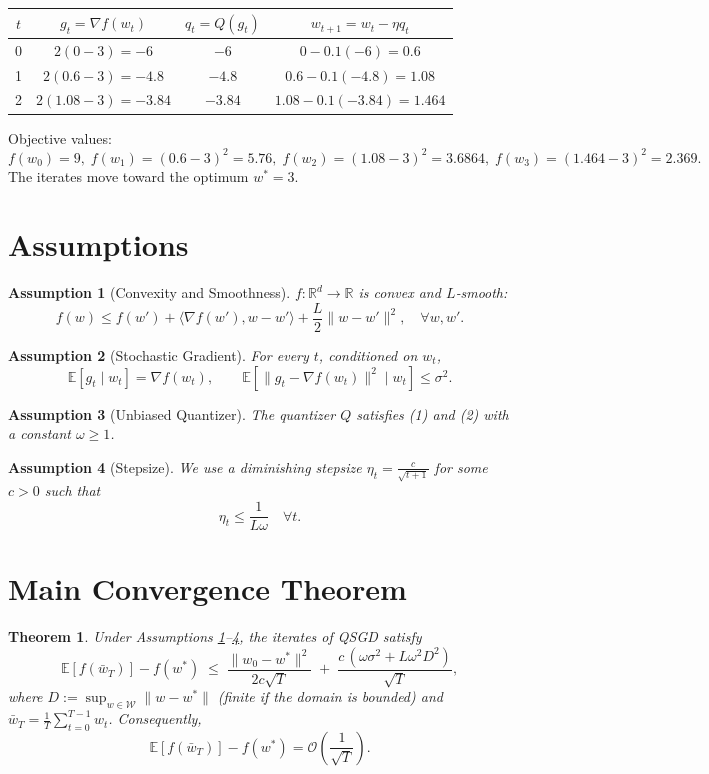 \documentclass[11pt]{article}
\newtheorem{theorem}{Theorem}
\newtheorem{assumption}{Assumption}
\newcommand{\E}{\mathbb{E}}
\newcommand{\R}{\mathbb{R}}
\begin{document}
\begin{center}
\begin{tabular}{c|c|c|c}
$t$ & $g_{t}= \nabla f(w_{t})$ & $q_{t}=Q(g_{t})$ & $w_{t+1}=w_{t}-\eta q_{t}$ \\ \hline
0 & $2(0-3)=-6$ & $-6$ & $0-0.1(-6)=0.6$ \\ 
1 & $2(0.6-3)=-4.8$ & $-4.8$ & $0.6-0.1(-4.8)=1.08$ \\ 
2 & $2(1.08-3)=-3.84$ & $-3.84$ & $1.08-0.1(-3.84)=1.464$ 
\end{tabular}
\end{center}
Objective values:
\[
f(w_{0})=9,\; f(w_{1})=(0.6-3)^{2}=5.76,\; f(w_{2})=(1.08-3)^{2}=3.6864,\; f(w_{3})=(1.464-3)^{2}=2.369.
\]
The iterates move toward the optimum $w^{*}=3$.

\newpage

\section*{Assumptions}
\begin{assumption}[Convexity and Smoothness]\label{ass:convex}
$f:\R^{d}\rightarrow\R$ is convex and $L$‑smooth:
\[
f(w)\le f(w')+\langle\nabla f(w'),w-w'\rangle+\frac{L}{2}\|w-w'\|^{2},\quad\forall w,w'.
\]
\end{assumption}
\begin{assumption}[Stochastic Gradient]\label{ass:sgd}
For every $t$, conditioned on $w_{t}$,
\[
\E[g_{t}\mid w_{t}]=\nabla f(w_{t}),\qquad
\E[\|g_{t}-\nabla f(w_{t})\|^{2}\mid w_{t}]\le\sigma^{2}.
\]
\end{assumption}
\begin{assumption}[Unbiased Quantizer]\label{ass:quant}
The quantizer $Q$ satisfies (1) and (2) with a constant $\omega\ge1$.
\end{assumption}
\begin{assumption}[Stepsize]\label{ass:stepsize}
We use a diminishing stepsize $\eta_{t}= \frac{c}{\sqrt{t+1}}$ for some $c>0$ such that
\[
\eta_{t}\le \frac{1}{L\omega}\quad\forall t.
\]
\end{assumption}

\section*{Main Convergence Theorem}
\begin{theorem}\label{thm:conv}
Under Assumptions \ref{ass:convex}–\ref{ass:stepsize}, the iterates of QSGD satisfy
\[
\E\!\left[f\!\left(\bar w_{T}\right)\right]-f(w^{*})
\;\le\;
\frac{\|w_{0}-w^{*}\|^{2}}{2c\sqrt{T}}
\;+\;
\frac{c\,( \omega\sigma^{2}+L\omega^{2}D^{2})}{\sqrt{T}},
\]
where $D:=\sup_{w\in\mathcal{W}}\|w-w^{*}\|$ (finite if the domain is bounded) and $\bar w_{T}=\frac{1}{T}\sum_{t=0}^{T-1}w_{t}$.
Consequently,
\[
\E\!\left[f\!\left(\bar w_{T}\right)\right]-f(w^{*}) =\mathcal{O}\!\left(\frac{1}{\sqrt{T}}\right).
\]
\end{theorem}
\end{document}
